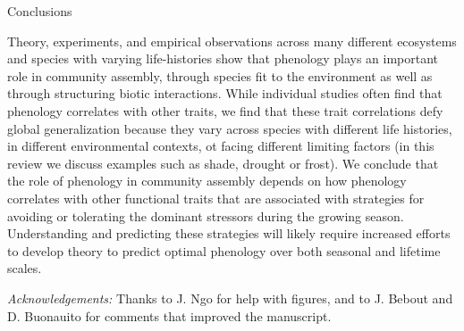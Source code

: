 \documentclass[11pt]{article}
\begin{document}
Conclusions

Theory, experiments, and empirical observations across many different ecosystems and species with varying life-histories show that phenology plays an important role in community assembly, through species fit to the environment as well as through structuring biotic interactions. While individual studies often find that phenology correlates with other traits, we find that these trait correlations defy global generalization because they vary across species with different life histories, in different environmental contexts, ot facing different limiting factors (in this review we discuss examples such as shade, drought or frost). We conclude that the role of phenology in community assembly depends on how phenology correlates with other functional traits that are associated with strategies for avoiding or tolerating the dominant stressors during the growing season. Understanding and predicting these strategies will likely require increased efforts to develop theory to predict optimal phenology over both seasonal and lifetime scales.

\emph{Acknowledgements:} Thanks to J. Ngo for help with figures, and to J. Bebout and D. Buonauito for comments that improved the manuscript.

\newpage
\end{document}
